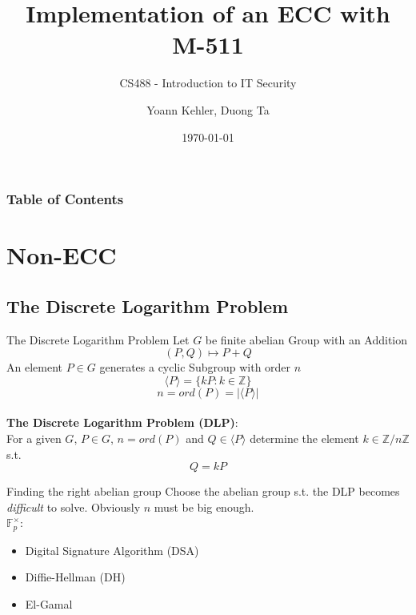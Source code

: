 \documentclass{beamer}
\begin{document}
\title{Implementation of an ECC with M-511} 
\subtitle{CS488 - Introduction to IT Security}
\author{Yoann Kehler, Duong Ta}
\date{\today} 

\begin{frame}
\titlepage
\end{frame} 

\begin{frame}
\frametitle{Table of Contents}\tableofcontents
\end{frame} 

\section{Non-ECC}
\subsection{The Discrete Logarithm Problem}
\begin{frame}{The Discrete Logarithm Problem}
	Let $G$ be finite abelian Group with an Addition \\
	\[(P,Q) \mapsto P + Q\]
	An element $P \in G$ generates a cyclic Subgroup with order $n$\\
	\[\langle P \rangle = \{kP : k \in \mathbb{Z} \} \]
	\[n = ord(P) = |\langle P \rangle| \]\\ \vspace{0.5cm}
	\textbf{The Discrete Logarithm Problem (DLP)}: \\
	For a given $G$, $P\in G$, $n = ord(P)$ and $Q \in \langle P \rangle$ determine the element $k \in \mathbb{Z}/n\mathbb{Z}$ s.t. \\
	\[Q=kP\]
	\cite{werner2013elliptische}
\end{frame}
\begin{frame}{Finding the right abelian group}
	Choose the abelian group s.t. the DLP becomes \textit{difficult} to solve. Obviously $n$ must be big enough. \\
	\vspace{2cm}
	$\mathbb{F}_p^\times$:
	\begin{itemize}
		\item Digital Signature Algorithm (DSA)
		\item Diffie-Hellman (DH)
		\item El-Gamal
		
	\end{itemize}
\end{frame}
\end{document}
